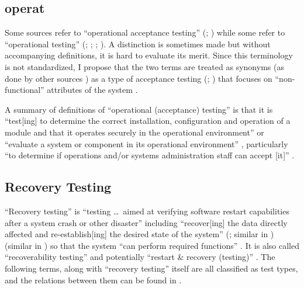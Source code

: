 \ifnotpaper
    \subsection[Operational (Acceptance) Testing (OAT)]{\acf{operat}}
    \label{oat-discrep}
    Some sources refer to ``operational acceptance testing'' (\citealp[p.~22]{IEEE2022};
    \citealpISTQB{}) while some refer to ``operational testing''
    (\citealp[p.~6-9,~in the context of software engineering operations]{SWEBOK2024};
    \citealp{ISO_IEC2018}; \citealp[p.~303]{IEEE2017};
    \citealp[pp.~4-6,~4-9]{SWEBOK2014}). A distinction is sometimes made
    \citep[p.~30]{Firesmith2015} but without accompanying definitions, it is hard
    to evaluate its merit. Since this terminology is not standardized, I
    propose that the two terms are treated as synonyms (as done by other sources
    \citep{LambdaTest2024, BocchinoAndHamilton1996}) as a type of
    acceptance testing (\citealp[p.~22]{IEEE2022}; \citealpISTQB{}) that focuses on
    ``non-functional'' attributes of the system \citep{LambdaTest2024}%
    .

    A summary of definitions of ``operational (acceptance) testing'' is that
    it is ``test[ing] to determine the correct
    installation, configuration and operation of a module and that it operates
    securely in the operational environment'' \citep{ISO_IEC2018} or ``evaluate a
    system or component in its operational environment'' \citep[p.~303]{IEEE2017},
    particularly ``to determine if operations and/or systems administration staff
    can accept [it]'' \citepISTQB{}.
\fi

\subsection{Recovery Testing}
\label{recov-discrep}

``Recovery testing'' is ``testing \dots\ aimed at verifying
software restart capabilities after a system crash or other disaster''
\citep[p.~5-9]{SWEBOK2024} including ``recover[ing] the data directly affected
and re-establish[ing] the desired state of the system''
\ifnotpaper
    (\citealp{ISO_IEC2023a}; similar in \citealp[p.~7-10]{SWEBOK2024})
\else
    \cite{ISO_IEC2023a} (similar in \cite[p.~7-10]{SWEBOK2024})
\fi
so that the system ``can perform required functions'' \citep[p.~370]{IEEE2017}.
It is also called ``recoverability testing'' \cite[p.~47]{Kam2008} and
potentially ``restart \& recovery (testing)'' \cite[Fig.~5]{Gerrard2000a}.
The following terms, along with ``recovery testing'' itself
\citep[p.~22]{IEEE2022} are all classified as test types, and the relations
between them can be found in .

